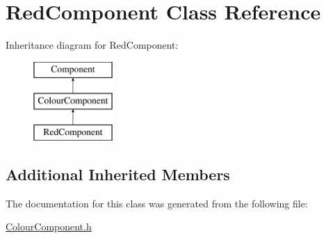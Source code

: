 \hypertarget{class_red_component}{}\section{Red\+Component Class Reference}
\label{class_red_component}
Inheritance diagram for Red\+Component\+:\begin{figure}[H]
\begin{center}
\leavevmode
\includegraphics[height=3.000000cm]{class_red_component}
\end{center}
\end{figure}
\subsection*{Additional Inherited Members}


The documentation for this class was generated from the following file\+:\begin{DoxyCompactItemize}
\item 
\mbox{\hyperlink{_colour_component_8h}{Colour\+Component.\+h}}\end{DoxyCompactItemize}
